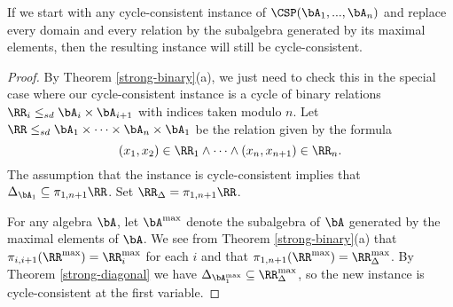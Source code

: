\begin{cor}\label{cycle-consistency-maximal} If we start with any cycle-consistent instance of $\CSP(\bA_1, ..., \bA_n)$ and replace every domain and every relation by the subalgebra generated by its maximal elements, then the resulting instance will still be cycle-consistent.
\end{cor}
\begin{proof} By Theorem \ref{strong-binary}(a), we just need to check this in the special case where our cycle-consistent instance is a cycle of binary relations $\RR_i \le_{sd} \bA_i\times \bA_{i+1}$ with indices taken modulo $n$. Let $\RR \le_{sd} \bA_1 \times \cdots \times \bA_n \times \bA_1$ be the relation given by the formula
\[
(x_1,x_2) \in \RR_1 \wedge \cdots \wedge (x_n,x_{n+1}) \in \RR_n.
\]
The assumption that the instance is cycle-consistent implies that $\Delta_{\bA_1} \subseteq \pi_{1,n+1} \RR$. Set $\RR_\Delta = \pi_{1,n+1} \RR$.

For any algebra $\bA$, let $\bA^{\max}$ denote the subalgebra of $\bA$ generated by the maximal elements of $\bA$. We see from Theorem \ref{strong-binary}(a) that $\pi_{i,i+1}(\RR^{\max}) = \RR_i^{\max}$ for each $i$ and that $\pi_{1,n+1}(\RR^{\max}) = \RR_\Delta^{\max}$. By Theorem \ref{strong-diagonal} we have $\Delta_{\bA_1^{\max}} \subseteq \RR_\Delta^{\max}$, so the new instance is cycle-consistent at the first variable.
\end{proof}

\begin{comment}
\begin{lem} Fix a partial semilattice operation $s$. If $\RR \le_{sd} \bA\times \bB\times \bB$ is finite, $\bA$ is simple and generated by a maximal strongly connected component $A$, $\Delta_\bB \subseteq \pi_{23}(\RR)$, and $\RR \cap (A \times \Delta_\bB) \ne \emptyset$, then $\RR \cap (\bA\times \Delta_\bB)$ is subdirect in $\bA\times \Delta_\bB$, that is, for every $a \in \bA$ there exists a $b \in \bB$ such that $(a,b,b) \in \RR$.
\end{lem}
\begin{proof} First suppose that one of $\pi_{12}(\RR), \pi_{13}(\RR)$ is the graph of a homomorphism $\pi : \bB \twoheadrightarrow \bA$. Then for any $a \in \bA$, if we take any $b \in \pi^{-1}(a)$, then there must exist some $a' \in \bA$ such that $(a',b,b) \in \RR$ by assumption, and we must have $a' = \pi(b) = a$. Thus we may assume that $\pi_{12}(\RR)$ and $\pi_{13}(\RR)$ are both linked.

Let $R$ be a maximal strongly connected component of $\RR$ which contains some element of $A\times \Delta_\bB$ - such an $R$ exists by Theorem \ref{strong-diagonal}. Let $B$ be the projection of $R$ onto the second coordinate. Then $R \subseteq A\times B\times B$ is subdirect and closed under $s$, and by Theorem \ref{strong-binary}(c) we have $\pi_{12}(R) = \pi_{13}(R) = A\times B$, so by Theorem \ref{strong-ternary} we have $R = A\times \pi_{23}(R)$. Since $\Delta_B \subseteq \pi_{23}(R)$, we have $A\times \Delta_B \subseteq \RR$, so $\bA \times \Delta_{\Sg(B)} \le \RR$.
\end{proof}
\end{comment}


